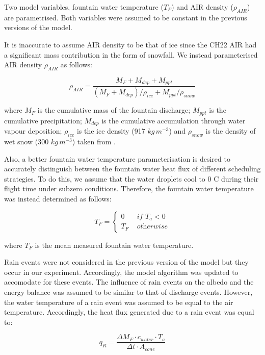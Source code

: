 \documentclass[tc, manuscript]{copernicus}
\begin{document}
Two model variables, fountain water temperature ($T_F$) and AIR density ($\rho_{AIR}$) are
parametrised. Both variables were assumed to be constant in the previous versions of the model. 

It is inaccurate to assume AIR density to be that of ice since the CH22 AIR had a significant mass contribution
in the form of snowfall. We instead parameterised AIR density $\rho_{AIR}$ as follows:

\begin{equation}
  \rho_{AIR} = \frac{M_{F} + M_{dep} + M_{ppt}}{(M_{F} + M_{dep})/\rho_{ice} + M_{ppt}/\rho_{snow}}
\end{equation}

where $M_F$ is the cumulative mass of the fountain discharge; $M_{ppt}$ is the cumulative precipitation; $M_{dep}$ is the cumulative accumulation through water vapour deposition; $\rho_{ice}$ is the ice density (917 $kg\,m^{-3}$) and $\rho_{snow}$ is the density of wet snow (300 $kg\,m^{-3}$) taken from
\cite{cuffeyPhysicsGlaciers2010} .

Also, a better fountain water temperature parameterisation is desired to accurately distinguish between the
fountain water heat flux of different scheduling strategies. To do this, we assume that the water droplets cool
to 0 C during their flight time under subzero conditions. Therefore, the fountain water temperature was instead
determined as follows:

\begin{equation}
	T_{F} = \left\{ \begin{array}{ll}
		0 & \textit{ if } T_{a} < 0 \\
		T_{F} & \textit{ otherwise}
	\end{array} \right.
\end{equation}

where $T_{F}$ is the mean measured fountain water temperature.

Rain events were not considered in the previous version of the model but they occur in our experiment.
Accordingly, the model algorithm was updated to accomodate for these events. The influence of rain events on the
albedo and the energy balance was assumed to be similar to that of discharge events. However, the water
temperature of a rain event was assumed to be equal to the air temperature. Accordingly, the heat flux generated
due to a rain event was equal to:

\begin{equation}
  q_{R} = \frac{\Delta M_{F} \cdot c_{water} \cdot T_{a}}{\Delta t \cdot A_{cone}}
\end{equation}
\end{document}
